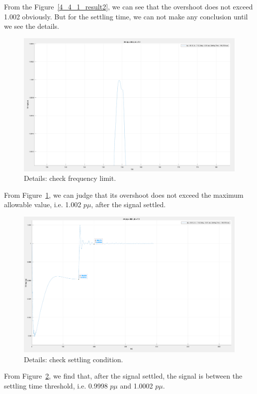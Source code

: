 From the Figure~\ref{4_4_1_result2}, we can see that the overshoot does not exceed 1.002 obviously. But for the settling time, we can not make any conclusion until we see the details. \\


\begin{figure}[htbp]
\centering
\includegraphics[width = .819\textwidth]{figure/4_4_1_result3.png}
\caption{Details: check frequency limit.}
\label{4_4_1_result3}
\end{figure}

From Figure~\ref{4_4_1_result3}, we can judge that its overshoot does not exceed the maximum allowable value, i.e. 1.002 $p\mu$, after the signal settled.\\

\begin{figure}[htbp]
\centering
\includegraphics[width = .819\textwidth]{figure/4_4_1_result4.png}
\caption{Details: check settling condition.}
\label{4_4_1_result4}
\end{figure}


From Figure~\ref{4_4_1_result4}, we find that, after the signal settled, the signal is between the settling time threshold, i.e. 0.9998 $p\mu$ and 1.0002 $p\mu$.\\


